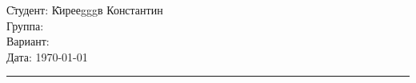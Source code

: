 \begin{tabbing}
	\hspace{11cm} \= Студент: \= Кирееgggв Константин \\
	\> Группа:  \\
	\> Вариант:  \\
	\> Дата: \> \today
\end{tabbing}
\hrule
\vspace{1cm}
